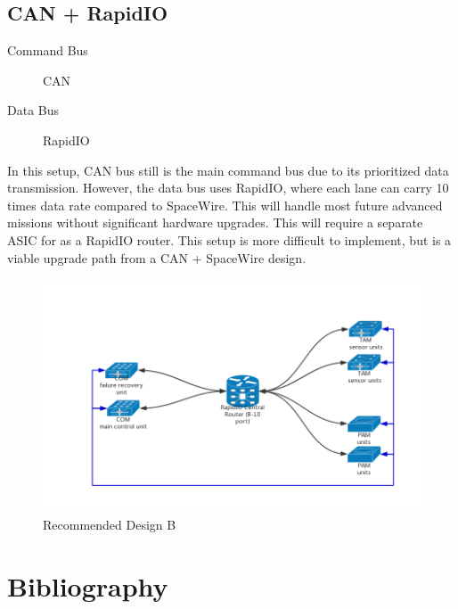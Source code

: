 \documentclass[12pt,article]{memoir}
\begin{document}
\section{CAN + RapidIO}
\begin{description}
	\item[Command Bus] CAN
	\item[Data Bus] RapidIO
\end{description}
In this setup, CAN bus still is the main command bus due to its prioritized data transmission. However, the data bus uses RapidIO, where each lane can carry 10 times data rate compared to SpaceWire. This will handle most future advanced missions without significant hardware upgrades. This will require a separate ASIC for as a RapidIO router. This setup is more difficult to implement, but is a viable upgrade path from a CAN + SpaceWire design.
\begin{figure}[H]
	\centering
	\includegraphics[width=\textwidth]{img/DR00001_RapidIO.png}
	\caption{Recommended Design B}
\end{figure}

\newpage

\chapter{Bibliography}
\printbibliography[heading=none]
\end{document}
